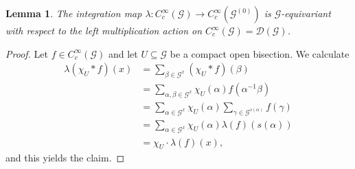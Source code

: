 \documentclass{amsart}
\newtheorem{lemma}[thm]{Lemma}
\newcommand{\G}{\mathcal{G}}
\newcommand{\DG}{\mathcal{D}(\mathcal{G})}
\newcommand{\ccinfty}{C_c^\infty}
\begin{document}
\begin{lemma} \label{integrationmap}
The integration map $ \lambda: \ccinfty(\G) \rightarrow\ccinfty(\G^{(0)}) $ is $ \G $-equivariant with respect to the left multiplication action on $ \ccinfty(\G) = \DG $. 
\end{lemma}

\begin{proof}
Let $ f \in \ccinfty(\G) $ and let $ U \subseteq \G $ be a compact open bisection. We calculate 
\begin{align*}
\lambda(\chi_U * f)(x) &= \sum_{\beta \in \G^x} (\chi_U * f)(\beta) \\
&= \sum_{\alpha, \beta \in \G^x} \chi_U(\alpha) f(\alpha^{-1} \beta) \\
&= \sum_{\alpha \in \G^x} \chi_U(\alpha) \sum_{\gamma \in \G^{s(\alpha)}} f(\gamma) \\
&= \sum_{\alpha \in \G^x} \chi_U(\alpha) \lambda(f)(s(\alpha)) \\
&= \chi_U \cdot \lambda(f)(x),  
\end{align*}
and this yields the claim. 
\end{proof}
\end{document}
